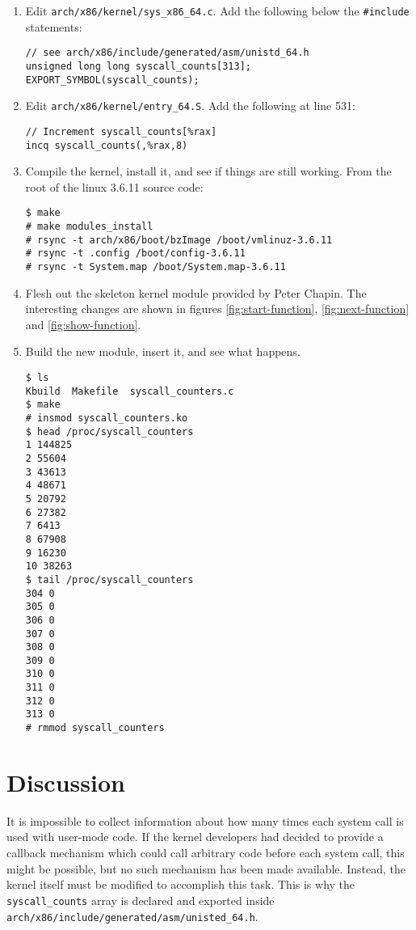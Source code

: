 \documentclass{article}
\begin{document}
\begin{enumerate}
\item Edit \texttt{arch/x86/kernel/sys\_x86\_64.c}. Add the following below the
\texttt{\#include} statements:
\begin{lstlisting}
// see arch/x86/include/generated/asm/unistd_64.h
unsigned long long syscall_counts[313];
EXPORT_SYMBOL(syscall_counts);
\end{lstlisting}

\item Edit \texttt{arch/x86/kernel/entry\_64.S}. Add the following at line 531:
\begin{lstlisting}
// Increment syscall_counts[%rax]
incq syscall_counts(,%rax,8)
\end{lstlisting}

\item Compile the kernel, install it, and see if things are still working.  From
the root of the linux 3.6.11 source code:
\begin{Verbatim}
$ make
# make modules_install
# rsync -t arch/x86/boot/bzImage /boot/vmlinuz-3.6.11
# rsync -t .config /boot/config-3.6.11
# rsync -t System.map /boot/System.map-3.6.11
\end{Verbatim}

\item Flesh out the skeleton kernel module provided by Peter Chapin. The
interesting changes are shown in figures \ref{fig:start-function},
\ref{fig:next-function} and \ref{fig:show-function}.

\item Build the new module, insert it, and see what happens.
\begin{Verbatim}
$ ls
Kbuild  Makefile  syscall_counters.c
$ make
# insmod syscall_counters.ko
$ head /proc/syscall_counters
1 144825
2 55604
3 43613
4 48671
5 20792
6 27382
7 6413
8 67908
9 16230
10 38263
$ tail /proc/syscall_counters
304 0
305 0
306 0
307 0
308 0
309 0
310 0
311 0
312 0
313 0
# rmmod syscall_counters
\end{Verbatim}
\end{enumerate}

\section{Discussion}
\label{sec:discussion}

It is impossible to collect information about how many times each system call is
used with user-mode code. If the kernel developers had decided to provide a
callback mechanism which could call arbitrary code before each system call, this
might be possible, but no such mechanism has been made available. Instead, the
kernel itself must be modified to accomplish this task. This is why the
\texttt{syscall\_counts} array is declared and exported inside
\texttt{arch/x86/include/generated/asm/unisted\_64.h}.
\end{document}
